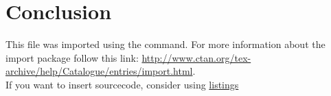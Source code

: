 \chapter{Conclusion}
This file was imported using the \verb|| command. For more information about the import package follow this link: 
\url{http://www.ctan.org/tex-archive/help/Catalogue/entries/import.html}.
\\
If you want to insert sourcecode, consider using \href{http://en.wikibooks.org/wiki/LaTeX/Packages/Listings}{listings}